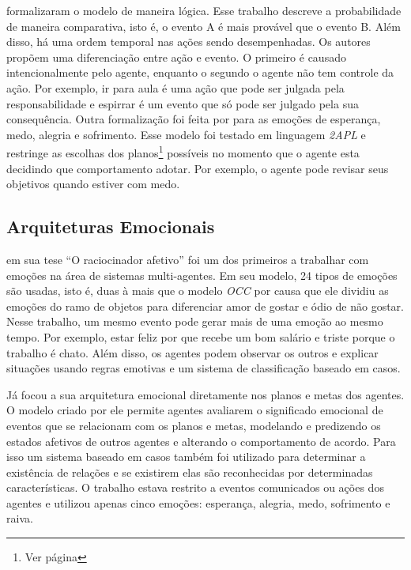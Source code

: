 \citet{adam2009alfototoe} formalizaram o modelo \occ de maneira lógica.
Esse trabalho descreve a probabilidade de maneira comparativa, isto é, o
evento A é mais provável que o evento B. Além disso, há uma ordem temporal nas
ações sendo desempenhadas. Os autores propõem uma diferenciação entre ação e
evento. O primeiro é causado intencionalmente pelo agente\dev{},
enquanto o segundo o agente não tem controle da ação. Por exemplo, ir para
aula é uma ação que pode ser julgada pela responsabilidade e espirrar é um
evento que só pode ser julgado pela sua consequência.
%
Outra formalização foi feita por \citet{steunebrink2010emotions} para as
emoções de esperança, medo, alegria e sofrimento. Esse modelo foi testado em
linguagem \emph{2APL} e restringe as escolhas dos planos\footnote{Ver página
\pageref{plan}} possíveis no momento que o agente esta decidindo que
comportamento adotar. Por exemplo, o agente pode revisar seus objetivos
quando estiver com medo.

\subsection{Arquiteturas Emocionais} %

\citet{elliott1992tar} em sua tese ``O raciocinador afetivo'' foi um dos
primeiros a trabalhar com emoções na área de sistemas multi-agentes. Em seu
modelo, 24 tipos de emoções são usadas, isto é, duas à mais que o modelo
\emph{OCC} por causa que ele dividiu as emoções do ramo de objetos para
diferenciar amor de gostar e ódio de não gostar. Nesse trabalho, um mesmo
evento pode gerar mais de uma emoção ao mesmo tempo. Por exemplo, estar feliz
por que recebe um bom salário e triste porque o trabalho é chato. Além disso,
os agentes podem observar os outros e explicar situações usando regras
emotivas e um sistema de classificação baseado em casos.

Já \citet{gratch2000empitae} focou a sua arquitetura emocional diretamente
nos planos e metas dos agentes. O modelo criado por ele permite agentes
avaliarem o significado emocional de eventos que se relacionam com os planos e
metas, modelando e predizendo os estados afetivos de outros agentes e
alterando o comportamento de acordo. Para isso um sistema baseado em casos
também foi utilizado para determinar a existência de relações e se existirem
elas são reconhecidas por determinadas características. O trabalho estava
restrito a eventos comunicados ou ações dos agentes e utilizou apenas cinco
emoções: esperança, alegria, medo, sofrimento e raiva.

